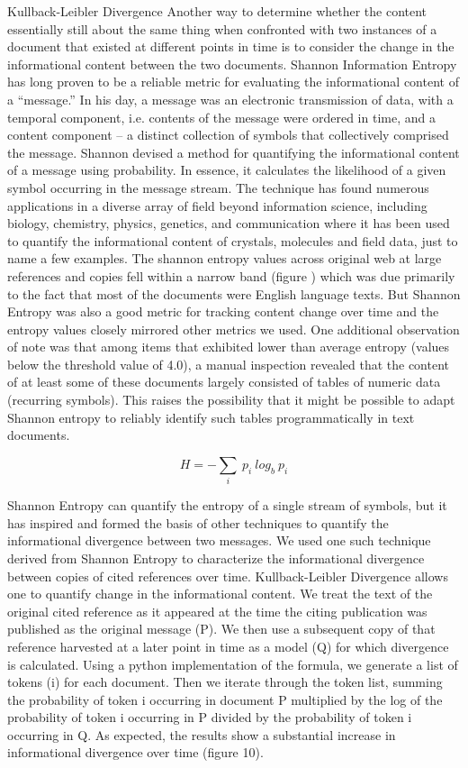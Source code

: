 \documentclass[12pt]{article}
\begin{document}
Kullback-Leibler Divergence 
Another way to determine whether the content essentially still about the same thing when confronted with two instances of a document that existed at different points in time is to consider the change in the informational content between the two documents. Shannon Information Entropy has long proven to be a reliable metric for evaluating the informational content of a “message.” In his day, a message was an electronic transmission of data, with a temporal component, i.e. contents of the message were ordered in time, and a content component – a distinct collection of symbols that collectively comprised the message. Shannon devised a method for quantifying the informational content of a message using probability. In essence, it calculates the likelihood of a given symbol occurring in the message stream. The technique has found numerous applications in a diverse array of field beyond information science, including biology, chemistry, physics, genetics, and communication where it has been used to quantify the informational content of crystals, molecules and field data, just to name a few examples. The shannon entropy values across original web at large references and copies fell within a narrow band (figure ) which was due primarily to the fact that most of the documents were English language texts. But Shannon Entropy was also a good metric for tracking content change over time and the entropy values closely mirrored other metrics we used. One additional observation of note was that among items that exhibited lower than average entropy (values below the threshold value of 4.0), a manual inspection revealed that the content of at least some of these documents largely consisted of tables of numeric data (recurring symbols). This raises the possibility that it might be possible  to adapt Shannon entropy to reliably identify such tables programmatically in text documents. 

     \[
        H = -{\sum_i} \ {p}_{i} \ log_b \ p_i
     \]

Shannon Entropy can quantify the entropy of a single stream of symbols, but it has inspired and formed the basis of other techniques to quantify the informational divergence between two messages. We used one such technique derived from Shannon Entropy to characterize the informational divergence between copies of cited references over time. Kullback-Leibler Divergence allows one to quantify change in the informational content. We treat the text of the original cited reference as it appeared at the time the citing publication was published as the original message (P). We then use a subsequent copy of that reference harvested at a later point in time as a model (Q) for which divergence is calculated. Using a python implementation of the formula, we generate a list of tokens (i) for each document. Then we iterate through the token list, summing the probability of token i occurring in document P multiplied by the log of the probability of token i occurring in P divided by the probability of token i occurring in Q. As expected, the results show a substantial increase in informational divergence over time (figure 10).
\end{document}
